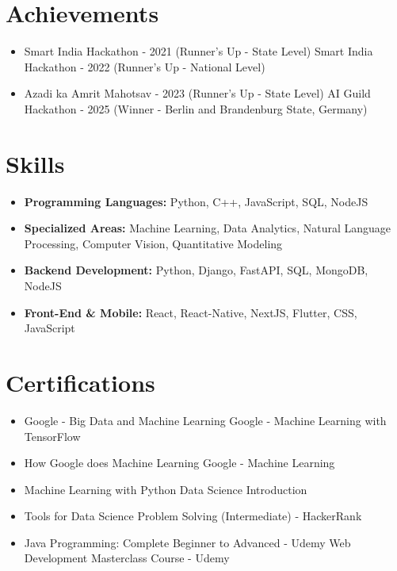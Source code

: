 \documentclass[a4paper,10pt]{article}
\begin{document}
\section*{Achievements}
\begin{itemize}
\item Smart India Hackathon - 2021 (Runner's Up - State Level) \hfill Smart India Hackathon - 2022 (Runner's Up - National Level)
\item Azadi ka Amrit Mahotsav - 2023 (Runner's Up - State Level) \hfill AI Guild Hackathon - 2025 (Winner - Berlin and Brandenburg State, Germany)
\end{itemize}

\section*{Skills}
\begin{itemize}
  \item \textbf{Programming Languages:} Python, C++, JavaScript, SQL, NodeJS
  \item \textbf{Specialized Areas:} Machine Learning, Data Analytics, Natural Language Processing, Computer Vision, Quantitative Modeling
  \item \textbf{Backend Development:} Python, Django, FastAPI, SQL, MongoDB, NodeJS
  \item \textbf{Front-End \& Mobile:} React, React-Native, NextJS, Flutter, CSS, JavaScript
\end{itemize}

\section*{Certifications}
\begin{itemize}
\item Google - Big Data and Machine Learning \hfill Google - Machine Learning with TensorFlow
\item How Google does Machine Learning \hfill Google - Machine Learning
\item Machine Learning with Python \hfill Data Science Introduction
\item Tools for Data Science \hfill Problem Solving (Intermediate) - HackerRank
\item Java Programming: Complete Beginner to Advanced - Udemy \hfill Web Development Masterclass Course - Udemy
\end{itemize}
\end{document}
